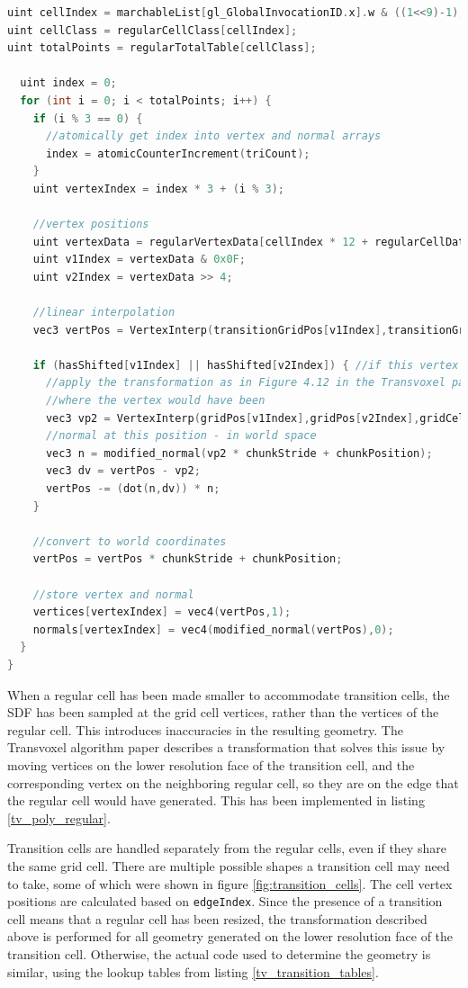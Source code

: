 \documentclass[11pt]{article}
\begin{document}
\begin{enumerate}
\begin{lstlisting}[language=C++,label={tv_poly_regular},caption={Code for generating the geometry in a regular cell}]
uint cellIndex = marchableList[gl_GlobalInvocationID.x].w & ((1<<9)-1);
uint cellClass = regularCellClass[cellIndex];
uint totalPoints = regularTotalTable[cellClass];

  uint index = 0;
  for (int i = 0; i < totalPoints; i++) {
    if (i % 3 == 0) {
      //atomically get index into vertex and normal arrays
      index = atomicCounterIncrement(triCount);
    }
    uint vertexIndex = index * 3 + (i % 3);

    //vertex positions
    uint vertexData = regularVertexData[cellIndex * 12 + regularCellData[cellClass * 16 + 1+i]];
    uint v1Index = vertexData & 0x0F;
    uint v2Index = vertexData >> 4;

    //linear interpolation
    vec3 vertPos = VertexInterp(transitionGridPos[v1Index],transitionGridPos[v2Index],gridCells[v1Index],gridCells[v2Index]);

    if (hasShifted[v1Index] || hasShifted[v2Index]) { //if this vertex has moved
      //apply the transformation as in Figure 4.12 in the Transvoxel paper
      //where the vertex would have been
      vec3 vp2 = VertexInterp(gridPos[v1Index],gridPos[v2Index],gridCells[v1Index], gridCells[v2Index]);
      //normal at this position - in world space
      vec3 n = modified_normal(vp2 * chunkStride + chunkPosition);
      vec3 dv = vertPos - vp2;
      vertPos -= (dot(n,dv)) * n;
    }

    //convert to world coordinates
    vertPos = vertPos * chunkStride + chunkPosition;

    //store vertex and normal
    vertices[vertexIndex] = vec4(vertPos,1);
    normals[vertexIndex] = vec4(modified_normal(vertPos),0);
  }
}
\end{lstlisting}
When a regular cell has been made smaller to accommodate transition cells, the SDF has been sampled at the grid cell vertices, rather than the vertices of the regular cell. This introduces inaccuracies in the resulting geometry. The Transvoxel algorithm paper describes a transformation that solves this issue by moving vertices on the lower resolution face of the transition cell, and the corresponding vertex on the neighboring regular cell, so they are on the edge that the regular cell would have generated. This has been implemented in listing \ref{tv_poly_regular}.

Transition cells are handled separately from the regular cells, even if they share the same grid cell. There are multiple possible shapes a transition cell may need to take, some of which were shown in figure \ref{fig:transition_cells}. The cell vertex positions are calculated based on \texttt{edgeIndex}. Since the presence of a transition cell means that a regular cell has been resized, the transformation described above is performed for all geometry generated on the lower resolution face of the transition cell. Otherwise, the actual code used to determine the geometry is similar, using the lookup tables from listing \ref{tv_transition_tables}.


\end{enumerate}
\end{document}

